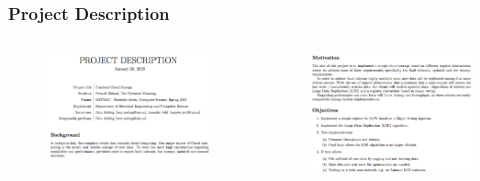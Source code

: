 \documentclass[hyperref={pdfpagelabels=false}, aspectratio=1610,handout]{beamer}
\begin{document}
\begin{frame}
\frametitle{Project Description}
\begin{block}{}
\begin{columns}

\begin{column}{.5\textwidth}
\begin{figure}[htbp]
\centering
\includegraphics[scale=0.2]{fig/p1}
\end{figure}
\end{column}

\begin{column}{.5\textwidth}
\begin{figure}[htbp]
\centering
\includegraphics[scale=0.25]{fig/p2}
\end{figure}
\end{column}

\end{columns}
\end{block}
\end{frame}
\end{document}
